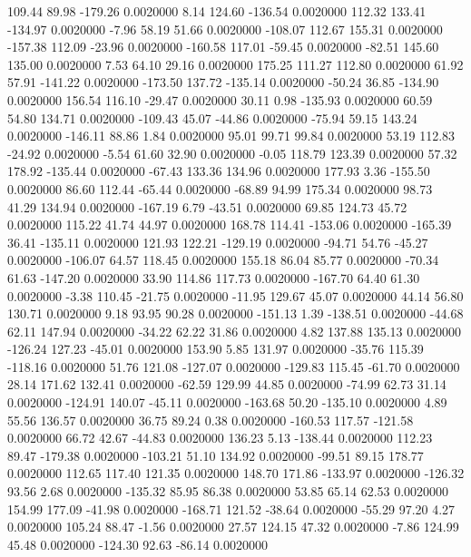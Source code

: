   109.44   89.98 -179.26   0.0020000
    8.14  124.60 -136.54   0.0020000
  112.32  133.41 -134.97   0.0020000
   -7.96   58.19   51.66   0.0020000
 -108.07  112.67  155.31   0.0020000
 -157.38  112.09  -23.96   0.0020000
 -160.58  117.01  -59.45   0.0020000
  -82.51  145.60  135.00   0.0020000
    7.53   64.10   29.16   0.0020000
  175.25  111.27  112.80   0.0020000
   61.92   57.91 -141.22   0.0020000
 -173.50  137.72 -135.14   0.0020000
  -50.24   36.85 -134.90   0.0020000
  156.54  116.10  -29.47   0.0020000
   30.11    0.98 -135.93   0.0020000
   60.59   54.80  134.71   0.0020000
 -109.43   45.07  -44.86   0.0020000
  -75.94   59.15  143.24   0.0020000
 -146.11   88.86    1.84   0.0020000
   95.01   99.71   99.84   0.0020000
   53.19  112.83  -24.92   0.0020000
   -5.54   61.60   32.90   0.0020000
   -0.05  118.79  123.39   0.0020000
   57.32  178.92 -135.44   0.0020000
  -67.43  133.36  134.96   0.0020000
  177.93    3.36 -155.50   0.0020000
   86.60  112.44  -65.44   0.0020000
  -68.89   94.99  175.34   0.0020000
   98.73   41.29  134.94   0.0020000
 -167.19    6.79  -43.51   0.0020000
   69.85  124.73   45.72   0.0020000
  115.22   41.74   44.97   0.0020000
  168.78  114.41 -153.06   0.0020000
 -165.39   36.41 -135.11   0.0020000
  121.93  122.21 -129.19   0.0020000
  -94.71   54.76  -45.27   0.0020000
 -106.07   64.57  118.45   0.0020000
  155.18   86.04   85.77   0.0020000
  -70.34   61.63 -147.20   0.0020000
   33.90  114.86  117.73   0.0020000
 -167.70   64.40   61.30   0.0020000
   -3.38  110.45  -21.75   0.0020000
  -11.95  129.67   45.07   0.0020000
   44.14   56.80  130.71   0.0020000
    9.18   93.95   90.28   0.0020000
 -151.13    1.39 -138.51   0.0020000
  -44.68   62.11  147.94   0.0020000
  -34.22   62.22   31.86   0.0020000
    4.82  137.88  135.13   0.0020000
 -126.24  127.23  -45.01   0.0020000
  153.90    5.85  131.97   0.0020000
  -35.76  115.39 -118.16   0.0020000
   51.76  121.08 -127.07   0.0020000
 -129.83  115.45  -61.70   0.0020000
   28.14  171.62  132.41   0.0020000
  -62.59  129.99   44.85   0.0020000
  -74.99   62.73   31.14   0.0020000
 -124.91  140.07  -45.11   0.0020000
 -163.68   50.20 -135.10   0.0020000
    4.89   55.56  136.57   0.0020000
   36.75   89.24    0.38   0.0020000
 -160.53  117.57 -121.58   0.0020000
   66.72   42.67  -44.83   0.0020000
  136.23    5.13 -138.44   0.0020000
  112.23   89.47 -179.38   0.0020000
 -103.21   51.10  134.92   0.0020000
  -99.51   89.15  178.77   0.0020000
  112.65  117.40  121.35   0.0020000
  148.70  171.86 -133.97   0.0020000
 -126.32   93.56    2.68   0.0020000
 -135.32   85.95   86.38   0.0020000
   53.85   65.14   62.53   0.0020000
  154.99  177.09  -41.98   0.0020000
 -168.71  121.52  -38.64   0.0020000
  -55.29   97.20    4.27   0.0020000
  105.24   88.47   -1.56   0.0020000
   27.57  124.15   47.32   0.0020000
   -7.86  124.99   45.48   0.0020000
 -124.30   92.63  -86.14   0.0020000
